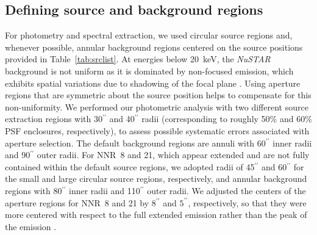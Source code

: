 \documentclass[iop,revtex4]{emulateapj}
\begin{document}
\subsection{Defining source and background regions}
\label{sec:regions}
For photometry and spectral extraction, we used circular source regions and, whenever possible, annular background regions centered on the source positions provided in Table~\ref{tab:srclist}.  At energies below 20~keV, the \textit{NuSTAR} background is not uniform as it is dominated by non-focused emission, which exhibits spatial variations due to shadowing of the focal plane \citep{harrison13}.  Using aperture regions that are symmetric about the source position helps to compensate for this non-uniformity.  We performed our photometric analysis with two different source extraction regions with 30$^{\prime\prime}$ and 40$^{\prime\prime}$ radii (corresponding to roughly 50\% and 60\% PSF enclosures, respectively), to assess possible systematic errors associated with aperture selection.  The default background regions are annuli with 60$^{\prime\prime}$ inner radii and 90$^{\prime\prime}$ outer radii.  For NNR~8 and 21, which appear extended and are not fully contained within the default source regions, we adopted radii of 45$^{\prime\prime}$  and 60$^{\prime\prime}$ for the small and large circular source regions, respectively, and annular background regions with 80$^{\prime\prime}$ inner radii and 110$^{\prime\prime}$ outer radii.  We adjusted the centers of the aperture regions for NNR~8 and 21 by 8$^{\prime\prime}$ and $5^{\prime\prime}$, respectively, so that they were more centered with respect to the full extended emission rather than the peak of the emission \footnotemark{}. \par
\end{document}
